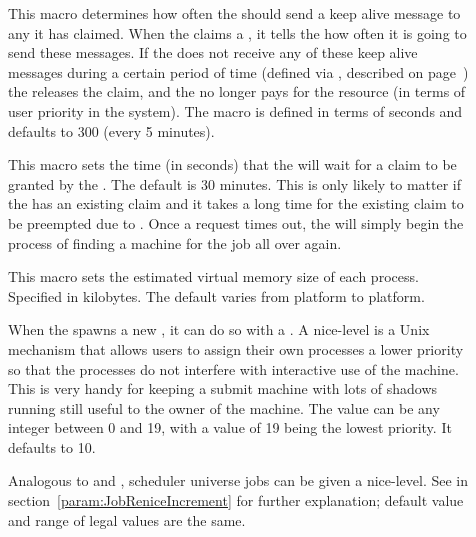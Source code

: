 \begin{description}
\item[] \label{param:AliveInterval} This
  macro determines how often the  should send a keep
  alive message to any  it has claimed.
  When the  claims a , it tells the  how often it is
  going to send these messages.
  If the  does not receive any of these keep alive messages
  during a certain period of time (defined via
  , described on
  page~\pageref{param:MaxClaimAlivesMissed})
  the  releases the claim, and the  no longer pays for
  the resource (in terms of user priority in the system).
  The macro is defined in terms of seconds and defaults to 300 (every
  5 minutes).

\item[]
  \label{param:RequestClaimTimeout} This macro sets the time (in
  seconds) that the  will wait for a claim to be granted by the
  .  The default is 30 minutes.  This is only likely to matter
  if the  has an existing claim and it takes a long time for the
  existing claim to be preempted due to .
  Once a request times out, the  will simply begin the process
  of finding a machine for the job all over again.

\item[] \label{param:ShadowSizeEstimate}
  This macro sets the estimated virtual memory size of each
   process.  Specified in kilobytes.  The default
  varies from platform to platform.

\item[]
  \label{param:ShadowReniceIncrement} When the  spawns a new
  , it can do so with a .  A
  nice-level is a
  Unix mechanism that allows users to assign their own processes a lower 
  priority so that the processes do not interfere with interactive use of the
  machine.  This is very handy for keeping a submit machine with lots
  of shadows running still useful to the owner of the machine.  The
  value can be any integer between 0 and 19, with a value of 19 being
  the lowest priority.  It defaults to 10.

\item[]
  \label{param:SchedUnivReniceIncrement} Analogous to 
   and
  , scheduler universe jobs can
  be given a nice-level.
  See   in
  section~\ref{param:JobReniceIncrement} for further explanation;
  default value and range of legal values are the same.


\end{description}
